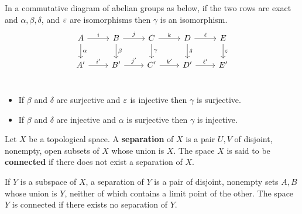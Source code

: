 \documentclass[12pt]{article}
\begin{document}
\begin{lemma}\label{lem:five}
  In a commutative diagram of abelian groups as below, if the two rows are exact and $\alpha,\beta,\delta$, and $\varepsilon$ are isomorphisms then $\gamma$ is an isomorphism.
  \[\begin{tikzcd}
      A\ar[r, "i"]\ar[d, "\alpha"]
    & B\ar[r, "j"]\ar[d, "\beta"]
    & C\ar[r, "k"]\ar[d, "\gamma"]
    & D\ar[r, "\ell"]\ar[d, "\delta"]
    & E\ar[d, "\e"]\\
      A'\ar[r, "i'"]
    & B'\ar[r, "j'"]
    & C'\ar[r, "k'"]
    & D'\ar[r, "\ell'"]
    & E'\\
  \end{tikzcd}\]

  \begin{itemize}
    \item If $\beta$ and $\delta$ are surjective and $\varepsilon$ is injective then $\gamma$ is surjective.
    \item If $\beta$ and $\delta$ are injective and $\alpha$ is surjective then $\gamma$ is injective.
  \end{itemize}
\end{lemma}

\begin{definition}
  Let $X$ be a topological space. A \textbf{separation} of $X$ is a pair $U, V$ of disjoint, nonempty, open subsets of $X$ whose union is $X$.
  The space $X$ is said to be \textbf{connected} if there does not exist a separation of $X$.
\end{definition}


\begin{lemma}
  If $Y$ is a subspace of $X$, a separation of $Y$ is a pair of disjoint, nonempty sets $A, B$ whose union is $Y$, neither of which contains a limit point of the other.
  The space $Y$ is connected if there exists no separation of $Y$.
\end{lemma}
\end{document}
